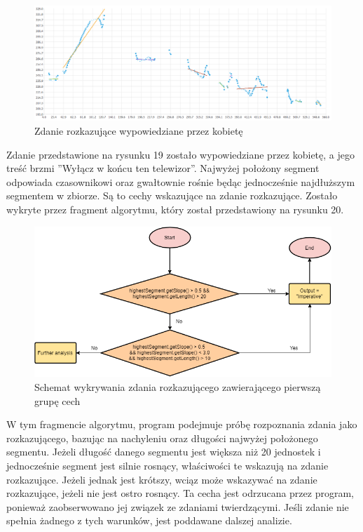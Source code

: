 \documentclass[a4paper,12 pt]{report}
\begin{document}
 \FloatBarrier
\begin{figure}[h]
\centering
\includegraphics[scale=0.6]{rozkaz_1_kobieta.png}
\caption{Zdanie rozkazujące wypowiedziane przez kobietę}
\end{figure}
\FloatBarrier

Zdanie przedstawione na rysunku 19 zostało wypowiedziane przez kobietę, a jego treść brzmi ''Wyłącz w końcu ten telewizor''. Najwyżej położony segment odpowiada czasownikowi oraz gwałtownie rośnie będąc jednocześnie najdłuższym segmentem w zbiorze. Są to cechy wskazujące na zdanie rozkazujące. 
Zostało wykryte przez fragment algorytmu, który został przedstawiony na rysunku 20.
 \FloatBarrier
\begin{figure}[h]
\centering
\includegraphics[scale=0.9]{Imperative1.png}
\caption{Schemat wykrywania zdania rozkazującego zawierającego pierwszą grupę cech}
\end{figure}
\FloatBarrier
W tym fragmencie algorytmu, program podejmuje próbę rozpoznania zdania jako rozkazującego, bazując na nachyleniu oraz długości najwyżej położonego segmentu.
Jeżeli długość danego segmentu jest większa niż 20 jednostek i jednocześnie segment jest silnie rosnący, właściwości te wskazują na zdanie rozkazujące. Jeżeli jednak jest krótszy, wciąz może wskazywać na zdanie rozkazujące, jeżeli nie jest ostro rosnący. Ta cecha jest odrzucana przez program, ponieważ zaobserwowano jej związek ze zdaniami twierdzącymi. Jeśli zdanie nie spełnia żadnego z tych warunków, jest poddawane dalszej analizie.
\end{document}

